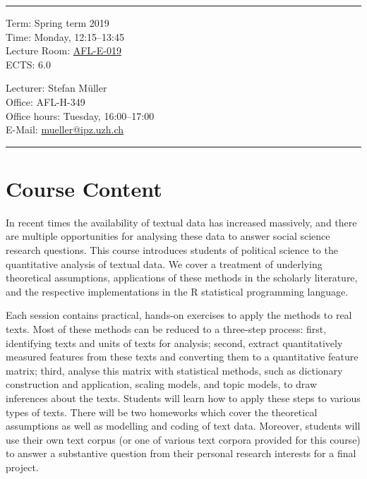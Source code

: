\documentclass[abstract=on,parskip=full,headings=standardclasses,fontsize=11pt,paper=a4]{scrartcl}
\begin{document}
\hrule
\medskip
\begin{minipage}[t]{0.5\textwidth}
Term: Spring term 2019 \\
Time: Monday, 12:15--13:45 \\
Lecture Room: \href{https://www.plaene.uzh.ch/AFL}{AFL-E-019 }\\
ECTS: 6.0
\end{minipage}
\begin{minipage}[t]{0.49\textwidth}
\begin{flushright}
Lecturer: Stefan Müller \\
Office:  AFL-H-349\\
Office hours: Tuesday, 16:00--17:00 \\
E-Mail: \textsf{\href{mailto:mueller@ipz.uzh.ch}{mueller@ipz.uzh.ch}}
\end{flushright}
\end{minipage}
\medskip
\vspace{2.5mm}
\hrule 

\section*{Course Content}

In recent times the availability of textual data has increased massively, and there are multiple opportunities for analysing these data to answer social science research questions. This course introduces students of political science to the quantitative analysis of textual data. We cover a treatment of underlying theoretical assumptions, applications of these methods in the scholarly literature, and the respective implementations in the \textsf{R} statistical programming language.

Each session  contains practical, hands-on exercises to apply the methods to real texts. Most of these methods can be reduced to a three-step process: first, identifying texts and units of texts for analysis; second, extract quantitatively measured features from these texts and converting them to a quantitative feature matrix; third, analyse this matrix with statistical methods, such as dictionary construction and application, scaling models, and topic models, to draw inferences about the texts. Students will learn how  to apply these steps to various types of texts. There will be two homeworks which cover the theoretical assumptions as well as modelling and coding of text data. Moreover, students will use their own text corpus (or one of various text corpora provided for this course) to answer a substantive question from their personal research interests for a final project.
\end{document}
